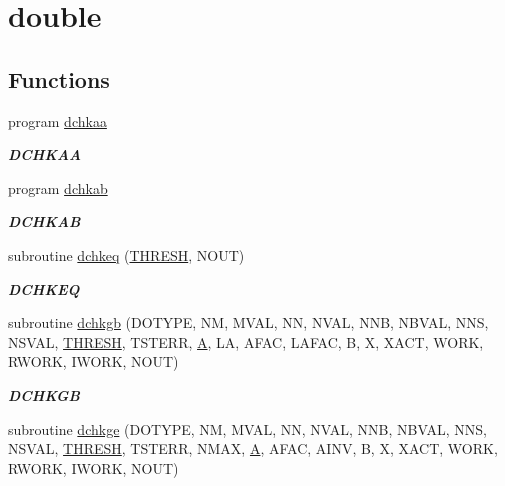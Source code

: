\hypertarget{group__double__lin}{}\section{double}
\label{group__double__lin}
\subsection*{Functions}
\begin{DoxyCompactItemize}
\item 
program \hyperlink{group__double__lin_gacc3a106614a533d1718bedc2b61b124b}{dchkaa}
\begin{DoxyCompactList}\small\item\em {\bfseries D\+C\+H\+K\+A\+A} \end{DoxyCompactList}\item 
program \hyperlink{group__double__lin_ga16d0ca73ea4d778d7bd902594f40193f}{dchkab}
\begin{DoxyCompactList}\small\item\em {\bfseries D\+C\+H\+K\+A\+B} \end{DoxyCompactList}\item 
subroutine \hyperlink{group__double__lin_ga726595e2dd94cc58e438f5d50f73bcb4}{dchkeq} (\hyperlink{zlaqgs_8c_a0656018abfc9fa2821827415f5d5ea57}{T\+H\+R\+E\+S\+H}, N\+O\+U\+T)
\begin{DoxyCompactList}\small\item\em {\bfseries D\+C\+H\+K\+E\+Q} \end{DoxyCompactList}\item 
subroutine \hyperlink{group__double__lin_gad3924356cc50b08a0bbce13f2dc6e679}{dchkgb} (D\+O\+T\+Y\+P\+E, N\+M, M\+V\+A\+L, N\+N, N\+V\+A\+L, N\+N\+B, N\+B\+V\+A\+L, N\+N\+S, N\+S\+V\+A\+L, \hyperlink{zlaqgs_8c_a0656018abfc9fa2821827415f5d5ea57}{T\+H\+R\+E\+S\+H}, T\+S\+T\+E\+R\+R, \hyperlink{classA}{A}, L\+A, A\+F\+A\+C, L\+A\+F\+A\+C, B, X, X\+A\+C\+T, W\+O\+R\+K, R\+W\+O\+R\+K, I\+W\+O\+R\+K, N\+O\+U\+T)
\begin{DoxyCompactList}\small\item\em {\bfseries D\+C\+H\+K\+G\+B} \end{DoxyCompactList}\item 
subroutine \hyperlink{group__double__lin_ga748bf8d2d379725b6ca1cacec204df9d}{dchkge} (D\+O\+T\+Y\+P\+E, N\+M, M\+V\+A\+L, N\+N, N\+V\+A\+L, N\+N\+B, N\+B\+V\+A\+L, N\+N\+S, N\+S\+V\+A\+L, \hyperlink{zlaqgs_8c_a0656018abfc9fa2821827415f5d5ea57}{T\+H\+R\+E\+S\+H}, T\+S\+T\+E\+R\+R, N\+M\+A\+X, \hyperlink{classA}{A}, A\+F\+A\+C, A\+I\+N\+V, B, X, X\+A\+C\+T, W\+O\+R\+K, R\+W\+O\+R\+K, I\+W\+O\+R\+K, N\+O\+U\+T)

\end{DoxyCompactItemize}
